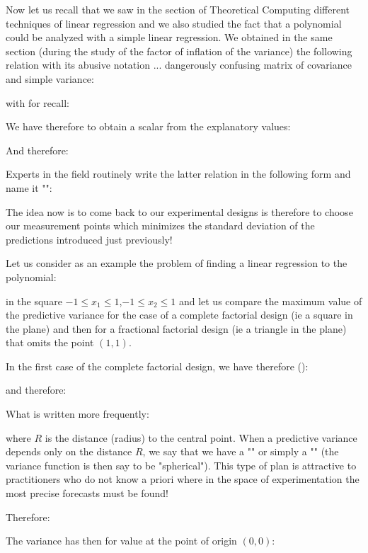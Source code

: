 	Now let us recall that we saw in the section of Theoretical Computing different techniques of linear regression and we also studied the fact that a polynomial could be analyzed with a simple linear regression. We obtained in the same section (during the study of the factor of inflation of the variance) the following relation with its abusive notation ... dangerously confusing matrix of covariance and simple variance:
	
	with for recall:
	
	We have therefore to obtain a scalar from the explanatory values:
	
 	And therefore:
	
	Experts in the field routinely write the latter relation in the following form and name it "":
	
	The idea now is to come back to our experimental designs is therefore to choose our measurement points which minimizes the standard deviation of the predictions introduced just previously!

	Let us consider as an example the problem of finding a linear regression to the polynomial:
	
	in the square $-1\leq x_1 \leq 1$,$-1\leq x_2\leq 1$ and let us compare the maximum value of the predictive variance for the case of a complete factorial design (ie a square in the plane) and then for a fractional factorial design (ie a triangle in the plane) that omits the point $(1,1)$.
	
	In the first case of the complete factorial design, we have therefore ():
	
	and therefore:
	
	What is written more frequently:
	
	where $R$ is the distance (radius) to the central point. When a predictive variance depends only on the distance $R$, we say that we have a "" or simply a "" (the variance function is then say to be "spherical"). This type of plan is attractive to practitioners who do not know a priori where in the space of experimentation the most precise forecasts must be found!

	Therefore:
	
	The variance has then for value at the point of origin $(0,0)$:
	
